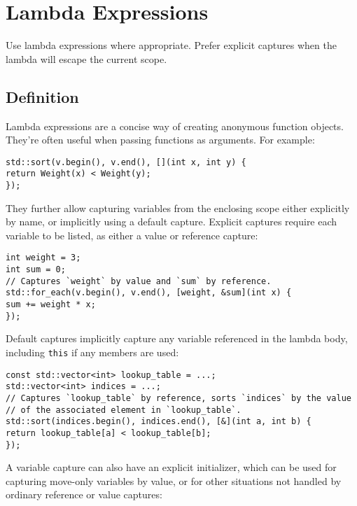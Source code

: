 
\section{Lambda Expressions}\label{ch07:sec:lambda-expressions}
Use lambda expressions where appropriate. Prefer explicit captures when the lambda will escape the current scope.

\subsection{Definition}
Lambda expressions are a concise way of creating anonymous function objects. They're often useful when passing functions as arguments. For example:
\begin{verbatim}
std::sort(v.begin(), v.end(), [](int x, int y) {
return Weight(x) < Weight(y);
});
\end{verbatim}
They further allow capturing variables from the enclosing scope either explicitly by name, or implicitly using a default capture. Explicit captures require each variable to be listed, as either a value or reference capture:
\begin{verbatim}
int weight = 3;
int sum = 0;
// Captures `weight` by value and `sum` by reference.
std::for_each(v.begin(), v.end(), [weight, &sum](int x) {
sum += weight * x;
});
\end{verbatim}
Default captures implicitly capture any variable referenced in the lambda body, including \texttt{this} if any members are used:
\begin{verbatim}
const std::vector<int> lookup_table = ...;
std::vector<int> indices = ...;
// Captures `lookup_table` by reference, sorts `indices` by the value
// of the associated element in `lookup_table`.
std::sort(indices.begin(), indices.end(), [&](int a, int b) {
return lookup_table[a] < lookup_table[b];
});
\end{verbatim}
A variable capture can also have an explicit initializer, which can be used for capturing move-only variables by value, or for other situations not handled by ordinary reference or value captures:
